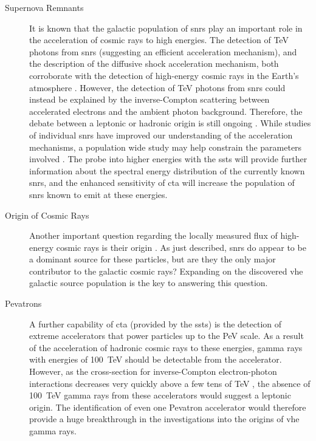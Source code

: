 \begin{description}
\item [Supernova Remnants] It is known that the galactic population of \glspl{snr} play an important role in the acceleration of cosmic rays to high energies. The detection of \si{TeV} photons from \glspl{snr} (suggesting an efficient acceleration mechanism), and the description of the diffusive shock acceleration mechanism, both corroborate with the detection of high-energy cosmic rays in the Earth's atmosphere \cite{Cristofari2017}. However, the detection of \si{TeV} photons from \glspl{snr} could instead be explained by the inverse-Compton scattering between accelerated electrons and the ambient photon background. Therefore, the debate between a leptonic or hadronic origin is still ongoing \cite{Acharya2013}. While studies of individual \glspl{snr} have improved our understanding of the acceleration mechanisms, a population wide study may help constrain the parameters involved \cite{Cristofari2017}. The probe into higher energies with the \glspl{sst} will provide further information about the spectral energy distribution of the currently known \glspl{snr}, and the enhanced sensitivity of \gls{cta} will increase the population of \glspl{snr} known to emit at these energies.
\item [Origin of Cosmic Rays] Another important question regarding the locally measured flux of high-energy cosmic rays is their origin \cite{Bigongiari2016}. As just described, \glspl{snr} do appear to be a dominant source for these particles, but are they the only major contributor to the galactic cosmic rays? Expanding on the discovered \gls{vhe} galactic source population is the key to answering this question.
\item [Pevatrons] A further capability of \gls{cta} (provided by the \glspl{sst}) is the detection of extreme accelerators that power particles up to the \si{PeV} scale. As a result of the acceleration of hadronic cosmic rays to these energies, gamma rays with energies of \SI{100}{TeV} should be detectable from the accelerator. However, as the cross-section for inverse-Compton electron-photon interactions decreases very quickly above a few tens of \si{TeV} \cite{Consortium2018}, the absence of \SI{100}{TeV} gamma rays from these accelerators would suggest a leptonic origin. The identification of even one Pevatron accelerator would therefore provide a huge breakthrough in the investigations into the origins of \gls{vhe} gamma rays.
\end{description}